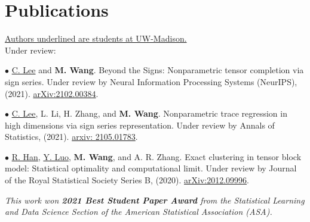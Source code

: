 \documentclass[letterpaper]{article}
\renewenvironment{itemize}{
  \begin{list}{}{
    \setlength{\leftmargin}{1.5em}
  }
}{
  \end{list}
}
\begin{document}
\section*{Publications}

\underline{Authors underlined are students at UW-Madison.}\\

Under review:
\begin{itemize}

\item$\bullet$  \underline{C. Lee} and {\bf M. Wang}. Beyond the Signs: Nonparametric tensor completion via sign series. Under review by Neural Information Processing Systems  (NeurIPS), (2021). \href{https://arxiv.org/abs/2102.00384}{arXiv:2102.00384}.

\item$\bullet$  \underline{C. Lee}, L. Li, H. Zhang, and {\bf M. Wang}. Nonparametric trace regression in high dimensions via sign series representation. Under review by Annals of Statistics, (2021). \href{https://arxiv.org/abs/2105.01783}{arxiv: 2105.01783}.

\item$\bullet$  \underline{R. Han}, \underline{Y. Luo}, {\bf M. Wang}, and A. R. Zhang. Exact clustering in tensor block model: Statistical optimality and computational limit. Under review by Journal of the Royal Statistical Society Series B, (2020). \href{https://arxiv.org/abs/2012.09996}{arXiv:2012.09996}.

{\it This work won {\bf 2021 Best Student Paper Award} from the Statistical Learning and Data Science Section of the American Statistical Association (ASA).}
\end{itemize}
\end{document}
